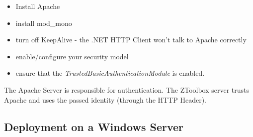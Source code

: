 \begin{itemize}
\item Install Apache
\item install mod\_mono
\item turn off KeepAlive - the .NET HTTP Client won't talk to Apache correctly 
\item enable/configure your security model
\item ensure that the
\emph{TrustedBasicAuthenticationModule} is enabled.
\end{itemize}

The Apache Server is responsible for authentication. The ZToolbox server trusts
Apache and uses the passed identity (through the HTTP Header).
 

\subsection{Deployment on a Windows Server}
